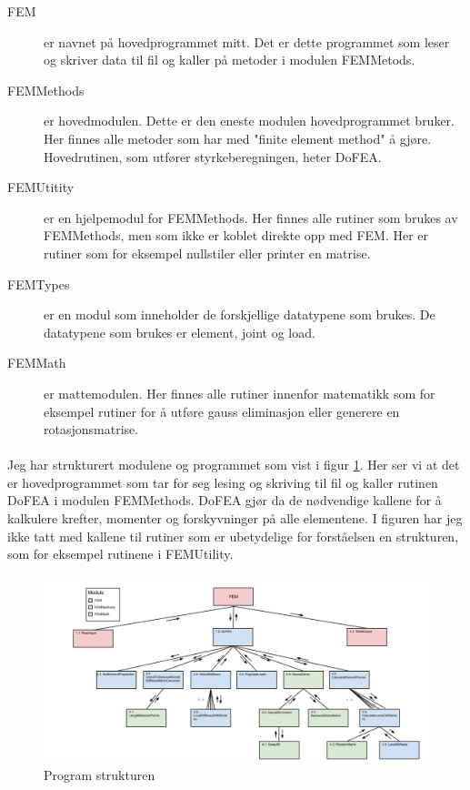 \documentclass[10pt,a4paper, norsk]{article}
\begin{document}
\begin{description}
\item[FEM] er navnet på hovedprogrammet mitt. Det er dette programmet som leser og skriver data til fil og kaller på metoder i modulen FEMMetods.
\item[FEMMethods] er hovedmodulen. Dette er den eneste modulen hovedprogrammet bruker. Her finnes alle metoder som har med "finite element method" å gjøre. Hovedrutinen, som utfører styrkeberegningen, heter DoFEA.
\item[FEMUtitity] er en hjelpemodul for FEMMethods. Her finnes alle rutiner som brukes av FEMMethods, men som ikke er koblet direkte opp med FEM. Her er rutiner som for eksempel nullstiler eller printer en matrise.
\item[FEMTypes] er en modul som inneholder de forskjellige datatypene som brukes. De datatypene som brukes er element, joint og load.
\item[FEMMath] er mattemodulen. Her finnes alle rutiner innenfor matematikk som for eksempel rutiner for å utføre gauss eliminasjon eller generere en rotasjonsmatrise.
\end{description}

\paragraph*{}
Jeg har strukturert modulene og programmet som vist i figur \ref{fig:struktur}. Her ser vi at det er hovedprogrammet som tar for seg lesing og skriving til fil og kaller rutinen DoFEA i modulen FEMMethods. DoFEA gjør da de nødvendige kallene for å kalkulere krefter, momenter og forskyvninger på alle elementene. I figuren har jeg ikke tatt med kallene til rutiner som er ubetydelige for forståelsen en strukturen, som for eksempel rutinene i FEMUtility. 

\begin{figure}[h]\label{fig:struktur}
\centering
\includegraphics[scale=0.31]{FEMAStructure.png} 
\caption{Program strukturen}
\end{figure}
\end{document}
